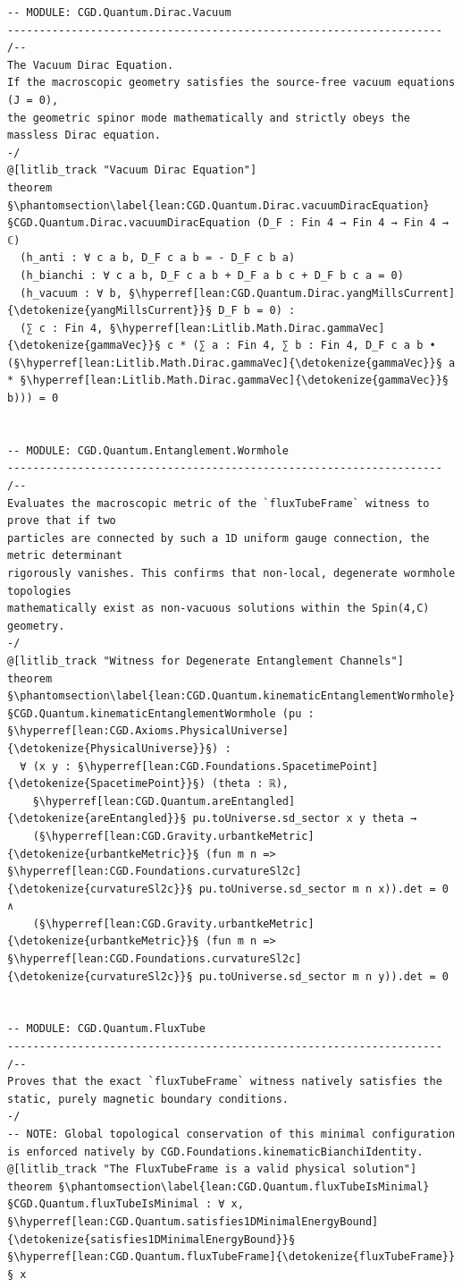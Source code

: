 \begin{verbatim}
-- MODULE: CGD.Quantum.Dirac.Vacuum
--------------------------------------------------------------------
/--
The Vacuum Dirac Equation.
If the macroscopic geometry satisfies the source-free vacuum equations (J = 0), 
the geometric spinor mode mathematically and strictly obeys the massless Dirac equation.
-/
@[litlib_track "Vacuum Dirac Equation"]
theorem §\phantomsection\label{lean:CGD.Quantum.Dirac.vacuumDiracEquation}§CGD.Quantum.Dirac.vacuumDiracEquation (D_F : Fin 4 → Fin 4 → Fin 4 → ℂ)
  (h_anti : ∀ c a b, D_F c a b = - D_F c b a)
  (h_bianchi : ∀ c a b, D_F c a b + D_F a b c + D_F b c a = 0)
  (h_vacuum : ∀ b, §\hyperref[lean:CGD.Quantum.Dirac.yangMillsCurrent]{\detokenize{yangMillsCurrent}}§ D_F b = 0) :
  (∑ c : Fin 4, §\hyperref[lean:Litlib.Math.Dirac.gammaVec]{\detokenize{gammaVec}}§ c * (∑ a : Fin 4, ∑ b : Fin 4, D_F c a b • (§\hyperref[lean:Litlib.Math.Dirac.gammaVec]{\detokenize{gammaVec}}§ a * §\hyperref[lean:Litlib.Math.Dirac.gammaVec]{\detokenize{gammaVec}}§ b))) = 0


-- MODULE: CGD.Quantum.Entanglement.Wormhole
--------------------------------------------------------------------
/--
Evaluates the macroscopic metric of the `fluxTubeFrame` witness to prove that if two
particles are connected by such a 1D uniform gauge connection, the metric determinant
rigorously vanishes. This confirms that non-local, degenerate wormhole topologies
mathematically exist as non-vacuous solutions within the Spin(4,C) geometry.
-/
@[litlib_track "Witness for Degenerate Entanglement Channels"]
theorem §\phantomsection\label{lean:CGD.Quantum.kinematicEntanglementWormhole}§CGD.Quantum.kinematicEntanglementWormhole (pu : §\hyperref[lean:CGD.Axioms.PhysicalUniverse]{\detokenize{PhysicalUniverse}}§) :
  ∀ (x y : §\hyperref[lean:CGD.Foundations.SpacetimePoint]{\detokenize{SpacetimePoint}}§) (theta : ℝ),
    §\hyperref[lean:CGD.Quantum.areEntangled]{\detokenize{areEntangled}}§ pu.toUniverse.sd_sector x y theta →
    (§\hyperref[lean:CGD.Gravity.urbantkeMetric]{\detokenize{urbantkeMetric}}§ (fun m n => §\hyperref[lean:CGD.Foundations.curvatureSl2c]{\detokenize{curvatureSl2c}}§ pu.toUniverse.sd_sector m n x)).det = 0 ∧
    (§\hyperref[lean:CGD.Gravity.urbantkeMetric]{\detokenize{urbantkeMetric}}§ (fun m n => §\hyperref[lean:CGD.Foundations.curvatureSl2c]{\detokenize{curvatureSl2c}}§ pu.toUniverse.sd_sector m n y)).det = 0


-- MODULE: CGD.Quantum.FluxTube
--------------------------------------------------------------------
/--
Proves that the exact `fluxTubeFrame` witness natively satisfies the static, purely magnetic boundary conditions.
-/
-- NOTE: Global topological conservation of this minimal configuration is enforced natively by CGD.Foundations.kinematicBianchiIdentity.
@[litlib_track "The FluxTubeFrame is a valid physical solution"]
theorem §\phantomsection\label{lean:CGD.Quantum.fluxTubeIsMinimal}§CGD.Quantum.fluxTubeIsMinimal : ∀ x, §\hyperref[lean:CGD.Quantum.satisfies1DMinimalEnergyBound]{\detokenize{satisfies1DMinimalEnergyBound}}§ §\hyperref[lean:CGD.Quantum.fluxTubeFrame]{\detokenize{fluxTubeFrame}}§ x


\end{verbatim}
